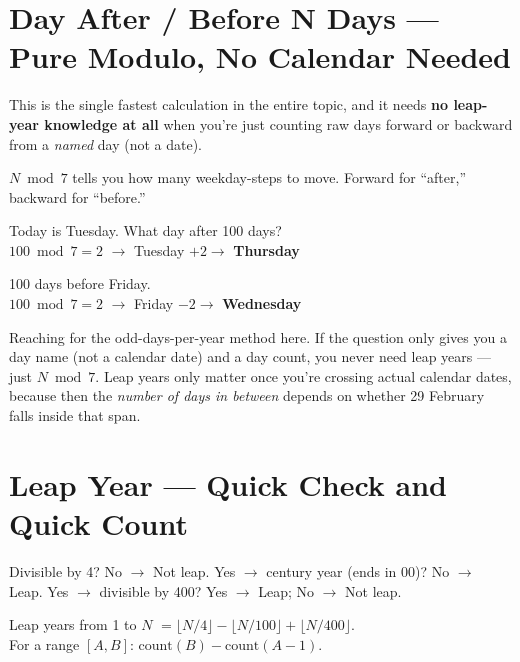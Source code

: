 \documentclass[11pt]{article}
\begin{document}
\section{Day After / Before N Days --- Pure Modulo, No Calendar Needed}

This is the single fastest calculation in the entire topic, and it needs \textbf{no leap-year
knowledge at all} when you're just counting raw days forward or backward from a \emph{named} day
(not a date).

\begin{formulabox}[Rule]
$N \bmod 7$ tells you how many weekday-steps to move. Forward for ``after,'' backward for ``before.''
\end{formulabox}

\begin{examplebox}
Today is Tuesday. What day after 100 days? \\
$100 \bmod 7 = 2$ $\to$ Tuesday $+2 \to$ \textbf{Thursday}
\end{examplebox}

\begin{examplebox}
100 days before Friday. \\
$100 \bmod 7 = 2$ $\to$ Friday $-2 \to$ \textbf{Wednesday}
\end{examplebox}

\begin{warnbox}
Reaching for the odd-days-per-year method here. If the question only gives you a day name (not a
calendar date) and a day count, you never need leap years --- just $N \bmod 7$. Leap years only
matter once you're crossing actual calendar dates, because then the \emph{number of days in between}
depends on whether 29 February falls inside that span.
\end{warnbox}

\section{Leap Year --- Quick Check and Quick Count}

\begin{formulabox}
Divisible by 4? No $\to$ Not leap. Yes $\to$ century year (ends in 00)? No $\to$ Leap. Yes $\to$
divisible by 400? Yes $\to$ Leap; No $\to$ Not leap.
\end{formulabox}

\begin{formulabox}
Leap years from 1 to $N$ $= \lfloor N/4 \rfloor - \lfloor N/100 \rfloor + \lfloor N/400 \rfloor$. \\
For a range $[A,B]$: $\text{count}(B) - \text{count}(A-1)$.
\end{formulabox}
\end{document}
